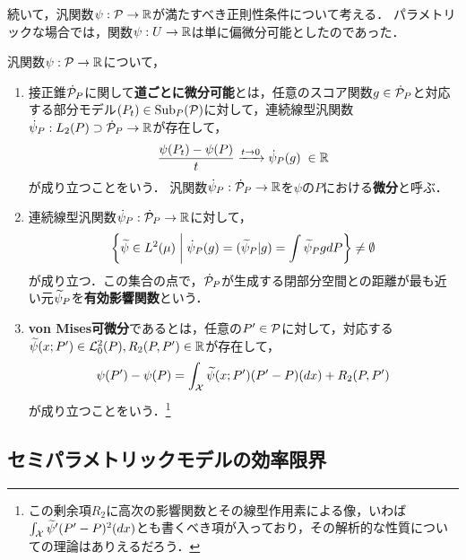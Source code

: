 \documentclass[uplatex, dvipdfmx]{jsarticle}
\newcommand{\Sub}{\mathrm{Sub}}
\begin{document}
続いて，汎関数$\psi:\P\to\R$が満たすべき正則性条件について考える．
パラメトリックな場合では，関数$\psi:U\to\R$は単に偏微分可能としたのであった．

\begin{definition}
    汎関数$\psi:\P\to\R$について，
    \begin{enumerate}
        \item 接正錐$\dot{\P}_P$に関して\textbf{道ごとに微分可能}とは，任意のスコア関数$g\in\dot{\P}_P$と対応する部分モデル$(P_t)\in\Sub_P(\P)$に対して，連続線型汎関数$\dot{\psi}_P:L_2(P)\supset\dot{\P}_P\to\R$が存在して，
        \[\frac{\psi(P_t)-\psi(P)}{t}\xrightarrow{t\to0}\dot{\psi}_P(g)\;\in\R\]
        が成り立つことをいう．
        汎関数$\dot{\psi}_P:\dot{\P}_P\to\R$を$\psi$の$P$における\textbf{微分}と呼ぶ．
        \item 連続線型汎関数$\dot{\psi}_P:\dot{\P}_P\to\R$に対して，
        \[\Brace{\wt{\psi}\in L^2(\mu)\;\middle|\;\dot{\psi}_P(g)=(\wt{\psi}_P|g)=\int\wt{\psi}_PgdP}\ne\emptyset\]
        が成り立つ．この集合の点で，$\dot{\P}_P$が生成する閉部分空間との距離が最も近い元$\wt{\psi}_P$を\textbf{有効影響関数}という．
        \item \textbf{von Mises可微分}であるとは，任意の$P'\in\P$に対して，対応する$\wt{\psi}(x;P')\in\L^2_0(P),R_2(P,P')\in\R$が存在して，
        \[\psi(P')-\psi(P)=\int_\X\wt{\psi}(x;P')(P'-P)(dx)+R_2(P,P')\]
        が成り立つことをいう．\footnote{この剰余項$R_2$に高次の影響関数とその線型作用素による像，いわば$\int_\X\wt{\psi}'(P'-P)^2(dx)$とも書くべき項が入っており，その解析的な性質についての理論はありえるだろう．}
    \end{enumerate}
\end{definition}

\subsection{セミパラメトリックモデルの効率限界}
\end{document}
